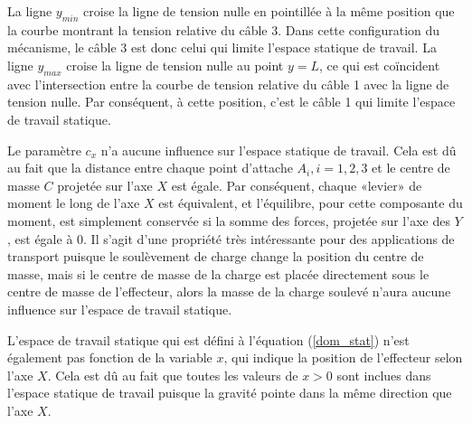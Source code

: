 La ligne $y_{min}$ croise la ligne de tension nulle en pointillée à la même position que la courbe montrant la tension relative du câble 3. Dans cette configuration du mécanisme, le câble 3 est donc celui qui limite l'espace statique de travail. La ligne $y_{max}$ croise la ligne de tension nulle au point $y=L$, ce qui est coïncident avec l'intersection entre la courbe de tension relative du câble 1 avec la ligne de tension nulle. Par conséquent, à cette position, c'est le câble 1 qui limite l'espace de travail statique.\par
Le paramètre $c_x$ n'a aucune influence sur l'espace statique de travail. Cela est dû au fait que la distance entre chaque point d'attache $A_i, i=1,2,3$ et le centre de masse $C$ projetée sur l'axe $X$ est égale. Par conséquent, chaque «levier» de moment le long de l'axe $X$ est équivalent, et l'équilibre, pour cette composante du moment, est simplement conservée si la somme des forces, projetée sur l'axe des $Y$, est égale à 0. Il s'agit d'une propriété très intéressante pour des applications de transport puisque le soulèvement de charge change la position du centre de masse, mais si le centre de masse de la charge est placée directement sous le centre de masse de l'effecteur, alors la masse de la charge soulevé n'aura aucune influence sur l'espace de travail statique. \par
L'espace de travail statique qui est défini à l'équation (\ref{dom_stat}) n'est également pas fonction de la variable $x$, qui indique la position de l'effecteur selon l'axe $X$. Cela est dû au fait que toutes les valeurs de $x>0$ sont inclues dans l'espace statique de travail puisque la gravité pointe dans la même direction que l'axe $X$.
